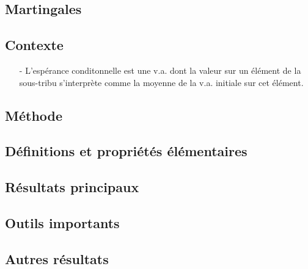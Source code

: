 \documentclass[11pt,a4paper]{article}
\begin{document}
\newpage
\begin{center}
\section*{Martingales} 
\end{center}








\subsection*{Contexte}
\begin{itemize}
\item[-] L'espérance conditonnelle est une v.a. dont la valeur sur un élément de la sous-tribu s'interprète comme la moyenne de la v.a. initiale sur cet élément.
\end{itemize}

\subsection*{Méthode}

\subsection*{Définitions et propriétés élémentaires}

\subsection*{Résultats principaux}


\subsection*{Outils importants}


\subsection*{Autres résultats}
\end{document}

